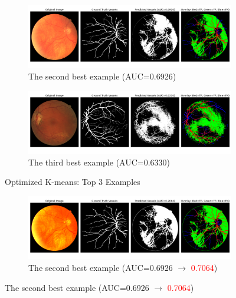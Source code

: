 \documentclass[final]{article}
\begin{document}
\begin{figure}[H]
    \centering
    \begin{subfigure}[H]{\textwidth}
        \centering
        \includegraphics[scale=0.3]{Figures/3 Optimized 2nd.png}
        \vspace{-0.25cm}
        \caption{The second best example (AUC=0.6926)}
        \label{fig:opt2}
    \end{subfigure}
    \begin{subfigure}[H]{\textwidth}
        \centering
        \includegraphics[scale=0.3]{Figures/3 Optimized 3rd.png}
        \vspace{-0.25cm}
        \caption{The third best example (AUC=0.6330)}
        \label{fig:opt3}
    \end{subfigure}
    \caption{Optimized K-means: Top 3 Examples}
    \label{fig:opt}
\end{figure}
\begin{figure}[H]
    \begin{subfigure}[H]{\textwidth}
        \centering
        \includegraphics[scale=0.3]{Figures/4 Optimized 2nd.png}
        \vspace{-0.25cm}
        \caption{The second best example (AUC=0.6926 $\rightarrow$ \textcolor{red}{0.7064})}
        \label{fig:opt_aug2}
    \end{subfigure}
\end{figure}
\end{document}
